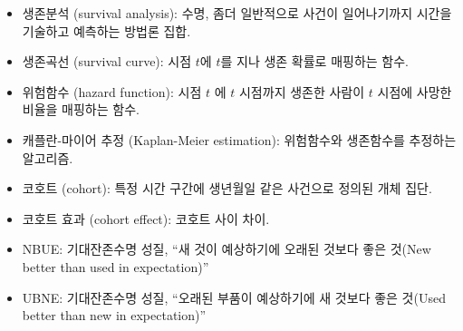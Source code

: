 \begin{itemize}

\item 생존분석 (survival analysis): 수명, 좀더 일반적으로 사건이 일어나기까지 시간을 기술하고 예측하는 방법론 집합.

\item 생존곡선 (survival curve): 시점 $t$에 $t$를 지나 생존 확률로 매핑하는 함수.

\item 위험함수 (hazard function): 시점 $t$ 에 $t$ 시점까지 생존한 사람이 $t$ 시점에 사망한 비율을 매핑하는 함수.

\item 캐플란-마이어 추정 (Kaplan-Meier estimation): 위험함수와 생존함수를 추정하는 알고리즘.

\item 코호트 (cohort): 특정 시간 구간에 생년월일 같은 사건으로 정의된 개체 집단.

\item 코호트 효과 (cohort effect): 코호트 사이 차이.

\item NBUE: 기대잔존수명 성질, ``새 것이 예상하기에 오래된 것보다 좋은 것(New better than used in expectation)''

\item UBNE: 기대잔존수명 성질, ``오래된 부품이 예상하기에 새 것보다 좋은 것(Used better than new in expectation)''

\end{itemize}

